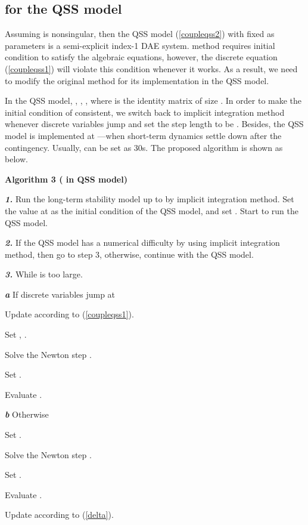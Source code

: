 \documentclass[journal]{IEEEtran}
\begin{document}
\subsection{ for the QSS model}
Assuming  is nonsingular, then the QSS model (\ref{coupleqss2}) with  fixed as parameters is a semi-explicit index-1 DAE system.  method requires initial condition to satisfy the algebraic equations, however, the discrete equation (\ref{coupleqss1}) will violate this condition whenever it works. As a result, we need to modify the original  method for its implementation in the QSS model.

In the QSS model, , , , where  is the identity matrix of size . In order to make the initial condition of  consistent, we switch back to implicit integration method whenever discrete variables jump and set the step length to be . Besides, the QSS model is implemented at ---when short-term dynamics settle down after the contingency. Usually,  can be set as 30s. The proposed algorithm is shown as below.
\begin{IEEEdescription}
\item[\textbf{Algorithm 3 ( in QSS model)}]
\item[\textbf{\textit{1.}}] Run the long-term stability model up to  by implicit integration method. Set the value  at  as the initial condition  of the QSS model, and set . Start to run the QSS model.
\item[\textbf{\textit{2.}}] If the QSS model has a numerical difficulty by using implicit integration method, then go to step 3, otherwise, continue with the QSS model.
\item[\textbf{\textit{3.}}] While  is too large.
\begin{LaTeXdescription}
\item[\textbf{\textit{a}}] If discrete variables jump at 
\begin{LaTeXdescription}
\item[\textbf{\textit{ }}]              Update  according to (\ref{coupleqss1}).
\item[\textbf{\textit{ }}]              Set , .
\item[\textbf{\textit{ }}]              Solve the Newton step .
\item[\textbf{\textit{ }}]              Set .
\item[\textbf{\textit{ }}]              Evaluate .
\end{LaTeXdescription}
\item[\textbf{\textit{b}}] Otherwise
\begin{LaTeXdescription}
\item[\textbf{\textit{ }}] Set .
\item[\textbf{\textit{ }}] Solve the Newton step .
\item[\textbf{\textit{ }}] Set .
\item[\textbf{\textit{ }}] Evaluate .
\item[\textbf{\textit{ }}] Update  according to (\ref{delta}).
\end{LaTeXdescription}
\end{LaTeXdescription}
\end{IEEEdescription}
\end{document}
